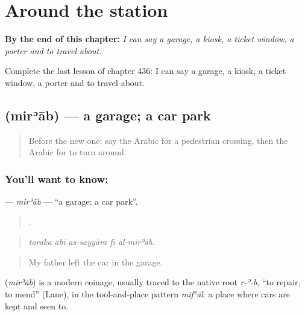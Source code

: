 
\chapter{Around the station}
\label{ch:ar-around-the-station}

\begin{chapteropening}
\textbf{By the end of this chapter:} \emph{I can say a garage, a kiosk, a ticket window, a porter and to travel about.}

Complete the last lesson of chapter 436: I can say a garage, a kiosk, a ticket window, a porter and to travel about.
\end{chapteropening}

\section[\texorpdfstring{\ar{مرآب} (mirʾāb)}{مرآب (mirʾāb)}]{ (mirʾāb) — a garage; a car park}

\label{lesson:AR-C436-mirab}



\begin{quote}
Before the new one: say the Arabic for a pedestrian crossing, then the Arabic for to turn around.
\end{quote}

\subsection*{You'll want to know: }
\textbf{} — \emph{mirʾāb} — \textquotedblleft{}a garage; a car park\textquotedblright{}.

\begin{quote}
    .
\end{quote}

\begin{quote}
\emph{taraka abī as-sayyāra fī al-mirʾāb.}
\end{quote}

\begin{quote}
My father left the car in the garage.
\end{quote}

\begin{cousinweb}
\textbf{} (\emph{mirʾāb}) is a modern coinage, usually traced to the native root \emph{r-ʾ-b}, \textquotedblleft{}to repair, to mend\textquotedblright{} (Lane), in the tool-and-place pattern \emph{mifʿāl}: a place where cars are kept and seen to.
\end{cousinweb}

